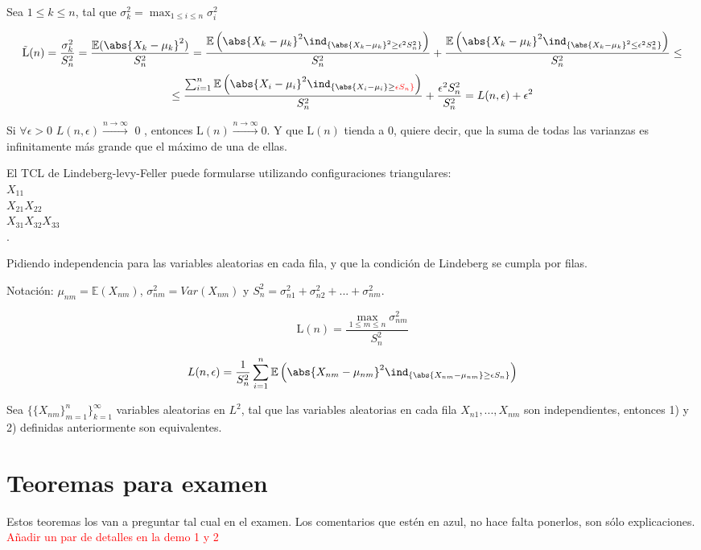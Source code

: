 \documentclass{apuntes}
\begin{document}
Sea $1\leq k \leq n$, tal que $\sigma^2_k=\max_{1\leq i \leq n}\sigma_i^2$

\[
\text{\~{L}}(n)=\frac{\sigma^2_k}{S^2_n}=\frac{\mathbb{E}(\abs{X_k-\mu_k}^2)}{S^2_n}=\frac{\mathbb{E}\left( \abs{X_k-\mu_k}^2 \ind_{\{\abs{X_k-\mu_k}^2\geq \epsilon^2 S_n^2\}} \right)}{S_n^2}+\frac{\mathbb{E}\left( \abs{X_k-\mu_k}^2 \ind_{\{\abs{X_k-\mu_k}^2\leq \epsilon^2 S_n^2\}} \right)}{S_n^2} \leq
\]
\[
\leq  \frac{\sum_{i=1}^{n}\mathbb{E}\left( \abs{X_i-\mu_i}^2 \ind_{\{\abs{X_i-\mu_i}\geq \textcolor{red}{\epsilon S_n\}}} \right)}{S^2_n}+\frac{\epsilon^2 S_n^2}{S_n^2} = L(n,\epsilon)+\epsilon^2
\]

Si $\forall \epsilon>0$ $L(n,\epsilon)\stackrel{n \rightarrow \infty}{\rightarrow}$ 0  , entonces $\text{\~{L}}(n)\stackrel{n \rightarrow \infty}{\rightarrow} 0$. Y que $\text{\~{L}}(n)$ tienda a 0, quiere decir, que la suma de todas las varianzas es infinitamente más grande que el máximo de una de ellas.

El TCL de Lindeberg-levy-Feller puede formularse utilizando configuraciones triangulares:\\
$X_{11}$\\
$X_{21} X_{22}$\\
$X_{31} X_{32} X_{33}$\\
.

Pidiendo independencia para las variables aleatorias en cada fila, y que la condición de Lindeberg se cumpla por filas. 

Notación: $\mu_{nm}=\mathbb{E}(X_{nm})$, $\sigma^2_{nm}=Var(X_{nm})$ y $S^2_n=\sigma^2_{n1}+\sigma^2_{n2}+...+\sigma^2_{nm}$.

\[
\text{\~{L}}(n)=\frac{\max_{1\leq m \leq n}\sigma^2_{nm}}{S^2_n}
\]

\[
L(n, \epsilon)=\frac{1}{S_n^2} \sum_{i=1}^{n}\mathbb{E}\left( \abs{X_{nm}-\mu_{nm}}^2 \ind_{\{\abs{X_{nm}-\mu_{nm}}\geq \epsilon S_n\}} \right)
\]

Sea $\{\{ X_{nm} \}^n_{m=1}\}^{\infty}_{k=1}$ variables aleatorias en $L^2$, tal que las variables aleatorias en cada fila $X_{n1},...,X_{nm}$ son independientes, entonces 1) y 2) definidas anteriormente son equivalentes.

\chapter{Teoremas para examen}
Estos teoremas los van a preguntar tal cual en el examen. Los comentarios que estén en azul, no hace falta ponerlos, son sólo explicaciones. \textcolor{red}{Añadir un par de detalles en la demo 1 y 2}
\end{document}
